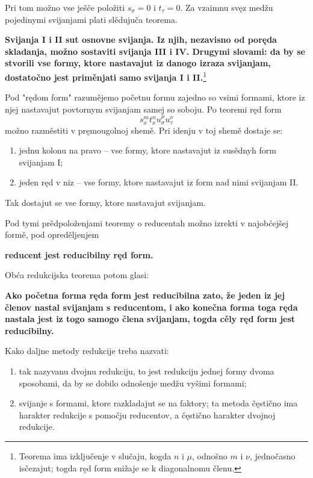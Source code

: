 \documentclass[11pt]{article}
\begin{document}
Pri tom možno vse ješče položiti $s_\sigma=0$ i $t_\tau=0$. Za vzaimnu svęz medžu pojedinymi svijanjami plati slědujuča teorema.

\textbf{Svijanja I i II sut osnovne svijanja. Iz njih, nezavisno od poręda skladanja, možno sostaviti svijanja III i IV. Drugymi slovami: da by se stvorili vse formy, ktore nastavajut iz danogo izraza svijanjam, dostatočno jest priměnjati samo svijanja I i II.}\footnote{Teorema ima izključenje v slučaju, kogda $n$ i $\mu$, odnošno $m$ i $\nu$, jednočasno isčezajut; togda ręd form snižaje se k diagonalnomu členu.}

Pod "rędom form" razumějemo početnu formu zajedno so vsimi formami, ktore iz njej nastavajut povtornym svijanjam samej so soboju. Po teoremi ręd form
\[
s_x^m t_x^n u_\sigma^\mu u_\tau^\nu
\]
možno razměstiti v pręmougolnoj shemě. Pri idenju v toj shemě dostaje se:
\begin{enumerate}
\item jednu kolonu na pravo -- vse formy, ktore nastavajut iz susědnyh form svijanjam I;
\item jeden ręd v niz -- vse formy, ktore nastavajut iz form nad nimi svijanjam II.
\end{enumerate}
Tak dostajut se vse formy, ktore nastavajut svijanjam.

Pod tymi prědpoloženjami teoremy o reducentah možno izrekti v najobćejšej formě, pod opreděljenjem
\begin{center}
\textbf{reducent jest reducibilny ręd form.}
\end{center}
Obća redukcijska teorema potom glasi:

\begin{center}
\textbf{Ako početna forma ręda form jest reducibilna zato, že jeden iz jej členov nastal svijanjam s reducentom, i ako konečna forma toga ręda nastala jest iz togo samogo člena svijanjam, togda cěly ręd form jest reducibilny.}
\end{center}

Kako daljne metody redukcije treba nazvati:
\begin{enumerate}
\item tak nazyvanu dvojnu redukciju, to jest redukciju jednej formy dvoma sposobami, da by se dobilo odnošenje medžu vyšimi formami;
\item svijanje s formami, ktore razkladajut se na faktory; ta metoda čęstično ima harakter redukcije s pomočju reducentov, a čęstično harakter dvojnoj redukcije.
\end{enumerate}
\end{document}
